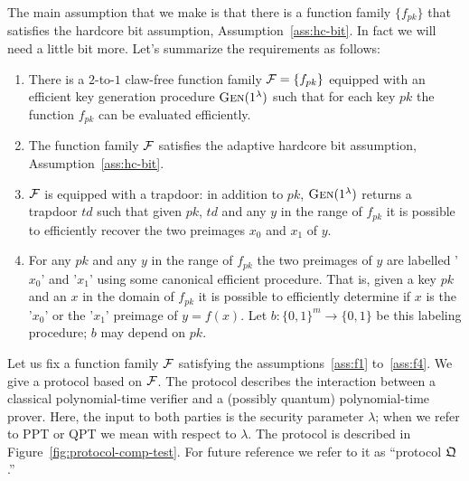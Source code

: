  The main assumption that we make is that there is a function family $\{f_{pk}\}$ that satisfies the hardcore bit assumption, Assumption~\ref{ass:hc-bit}. In fact we will need a little bit more. Let's summarize the requirements as follows:
\begin{enumerate}[label=(\textbf{F.\arabic*})]
\item\label{ass:f1} There is a $2$-to-$1$ claw-free function family $\mathcal{F} = \{f_{pk}\}$ equipped with an efficient key generation procedure $\textsc{Gen}(1^\lambda)$ such that for each key $pk$ the function $f_{pk}$ can be evaluated efficiently.
\item \label{ass:f2}The function family $\mathcal{F}$ satisfies the adaptive hardcore bit assumption, Assumption~\ref{ass:hc-bit}.
\item\label{ass:f3} $\mathcal{F}$ is equipped with a trapdoor: in addition to $pk$, $\textsc{Gen}(1^\lambda)$ returns a trapdoor $td$ such that given $pk$, $td$ and any $y$ in the range of $f_{pk}$ it is possible to efficiently recover the two preimages $x_0$ and $x_1$ of $y$. 
\item\label{ass:f4} For any $pk$ and any $y$ in the range of $f_{pk}$ the two preimages of $y$ are labelled '$x_0$' and '$x_1$' using some canonical efficient procedure. That is, given a key $pk$ and an $x$ in the domain of $f_{pk}$ it is possible to efficiently determine if $x$ is the '$x_0$' or the '$x_1$' preimage of $y=f(x)$. Let $b:\{0,1\}^m \to \{0,1\}$ be this labeling procedure; $b$ may depend on $pk$. 
\end{enumerate}
Let us fix a function family $\mathcal{F}$ satisfying the assumptions~\ref{ass:f1} to~\ref{ass:f4}. We give a protocol based on $\mathcal{F}$. The protocol describes the interaction between a classical polynomial-time verifier and a (possibly quantum) polynomial-time prover. Here, the input to both parties is the security parameter $\lambda$; when we refer to PPT or QPT we mean with respect to $\lambda$. The protocol is described in Figure~\ref{fig:protocol-comp-test}. For future reference we refer to it as ``protocol $\mathfrak{Q}$.''


